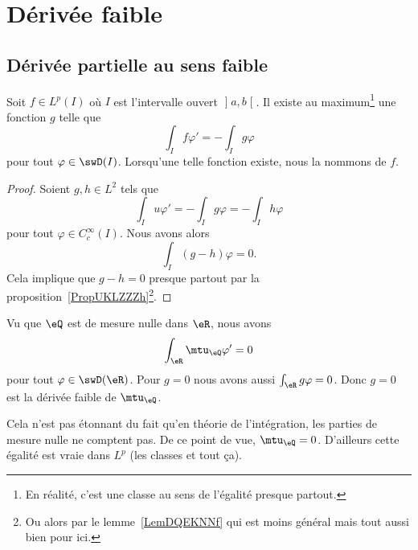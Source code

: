 \section{Dérivée faible}

\subsection{Dérivée partielle au sens faible}

\begin{lemmaDef}        \label{DEFooIRJQooMVNopl}
    Soit \( f\in L^p(I)\) où \( I\) est l'intervalle ouvert \( \mathopen] a , b \mathclose[\). Il existe au maximum\footnote{En réalité, c'est une classe au sens de l'égalité presque partout.} une fonction \( g\) telle que 
    \begin{equation}
        \int_If\varphi'=-\int_Ig\varphi
    \end{equation}
    pour tout \( \varphi\in \swD(I)   \). Lorsqu'une telle fonction existe, nous la nommons  de \( f\).
\end{lemmaDef}

\begin{proof}
    Soient \( g,h\in L^2\) tels que
    \begin{equation}
        \int_Iu\varphi'=-\int_Ig\varphi=-\int_Ih\varphi
    \end{equation}
    pour tout \( \varphi\in C^{\infty}_c(I)\). Nous avons alors
    \begin{equation}
        \int_I(g-h)\varphi=0.
    \end{equation}
    Cela implique que \( g-h=0\) presque partout par la proposition~\ref{PropUKLZZZh}\footnote{Ou alors par le lemme~\ref{LemDQEKNNf} qui est moins général mais tout aussi bien pour ici.}.
\end{proof}

\begin{example}
    Vu que \( \eQ\) est de mesure nulle dans \( \eR\), nous avons
    \begin{equation}
        \int_{\eR}\mtu_{\eQ}\varphi'=0
    \end{equation}
    pour tout \( \varphi\in\swD(\eR)\). Pour \( g=0\) nous avons aussi \( \int_{\eR}g\varphi=0\). Donc \( g=0\) est la dérivée faible de \( \mtu_{\eQ}\).

    Cela n'est pas étonnant du fait qu'en théorie de l'intégration, les parties de mesure nulle ne comptent pas. De ce point de vue, \( \mtu_{\eQ}=0\). D'ailleurs cette égalité est vraie dans \( L^p\) (les classes et tout ça).
\end{example}

